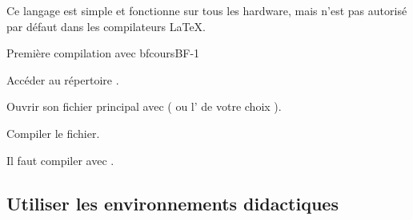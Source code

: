 \begin{Methode}
\begin{Remarque}
    Ce langage est simple et fonctionne sur tous les hardware, mais n'est pas autorisé par défaut dans les compilateurs \LaTeX.
\end{Remarque}
\end{Methode}

\begin{EXO}{Première compilation avec bfcours}{BF-1}

    Accéder au répertoire .

    Ouvrir son fichier principal  avec  ( ou l' de votre choix ).

    Compiler le fichier.
    
    \exocorrection

    Il faut compiler avec .
\end{EXO}
\subsection{Utiliser les environnements didactiques}

